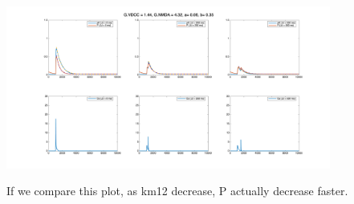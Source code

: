 \documentclass{article}
\begin{document}
\begin{minipage}{\textwidth} %
    \centering
    \includegraphics[width=0.8\textwidth]{G_VDCC=1.44_G_NMDA=4.32_a=0.060 b=0.35.png} %
    \label{fig:a0.25}
\end{minipage}
If we compare this plot, as km12 decrease, P actually decrease faster.
\end{document}
